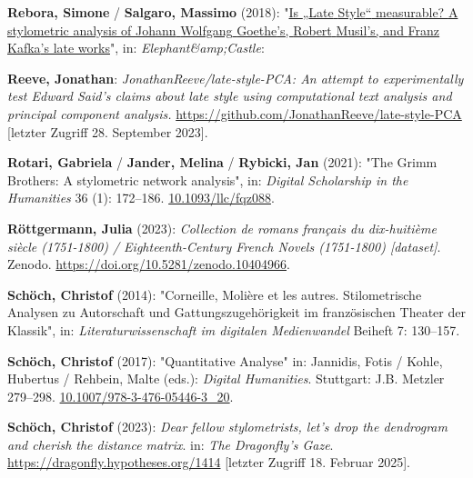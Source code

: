 \documentclass[
  12pt,
  letterpaper,
  DIV=11,
  numbers=noendperiod]{scrreprt}
\newlength{\cslhangindent}
\newenvironment{CSLReferences}[2] %
 {\begin{list}{}{%
  \setlength{\itemindent}{0pt}
  \setlength{\leftmargin}{0pt}
  \setlength{\parsep}{0pt}
  \ifodd #1
   \setlength{\leftmargin}{\cslhangindent}
   \setlength{\itemindent}{-1\cslhangindent}
  \fi
  \setlength{\itemsep}{#2\baselineskip}}}
 {\end{list}}
\begin{document}
\begin{CSLReferences}{1}{0}
\textbf{Rebora, Simone} / \textbf{Salgaro, Massimo} (2018):
"\href{https://www.academia.edu/37943274/Is_Late_Style_measurable_A_stylometric_analysis_of_Johann_Wolfgang_Goethe_s_Robert_Musil_s_and_Franz_Kafka_s_late_works}{Is
{„{Late} {Style}``} measurable? {A} stylometric analysis of {Johann}
{Wolfgang} {Goethe}'s, {Robert} {Musil}'s, and {Franz} {Kafka}'s late
works}", in: \emph{Elephant\&amp;Castle}:

\textbf{Reeve, Jonathan}: \emph{{JonathanReeve}/late-style-{PCA}: {An}
attempt to experimentally test {Edward} {Said}'s claims about late style
using computational text analysis and principal component analysis.}
\url{https://github.com/JonathanReeve/late-style-PCA} {[}letzter Zugriff
28. September 2023{]}.

\textbf{Rotari, Gabriela} / \textbf{Jander, Melina} / \textbf{Rybicki,
Jan} (2021): "The {Grimm} {Brothers}: {A} stylometric network analysis",
in: \emph{Digital Scholarship in the Humanities} 36 (1): 172--186.
\href{https://doi.org/10.1093/llc/fqz088}{10.1093/llc/fqz088}.

\textbf{Röttgermann, Julia} (2023): \emph{Collection de romans français
du dix-huitième siècle (1751-1800) / {Eighteenth}-{Century} {French}
{Novels} (1751-1800) {[}dataset{]}}. Zenodo.
\url{https://doi.org/10.5281/zenodo.10404966}.

\textbf{Schöch, Christof} (2014): "Corneille, {Molière} et les autres.
{Stilometrische} {Analysen} zu {Autorschaft} und {Gattungszugehörigkeit}
im französischen {Theater} der {Klassik}", in:
\emph{Literaturwissenschaft im digitalen Medienwandel} Beiheft 7:
130--157.

\textbf{Schöch, Christof} (2017): "Quantitative {Analyse}" in: Jannidis,
Fotis / Kohle, Hubertus / Rehbein, Malte (eds.): \emph{Digital
{Humanities}}. Stuttgart: J.B. Metzler 279--298.
\href{https://doi.org/10.1007/978-3-476-05446-3_20}{10.1007/978-3-476-05446-3\_20}.

\textbf{Schöch, Christof} (2023): \emph{Dear fellow stylometrists, let's
drop the dendrogram and cherish the distance matrix}. in: \emph{The
Dragonfly's Gaze}. \url{https://dragonfly.hypotheses.org/1414}
{[}letzter Zugriff 18. Februar 2025{]}.


\end{CSLReferences}
\end{document}
